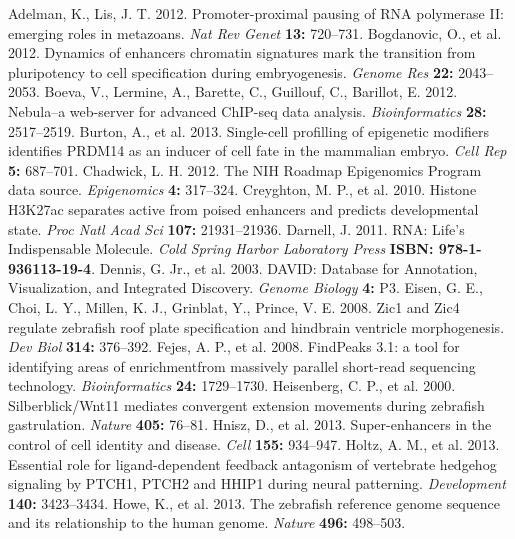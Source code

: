 \begin{thebibliography}{40}
	 Adelman, K., Lis, J. T. 2012. Promoter-proximal pausing of RNA polymerase II: emerging roles in metazoans. \emph{Nat Rev Genet} \textbf{13:} 720--731.
	 Bogdanovic, O., et al. 2012. Dynamics of enhancers chromatin signatures mark the transition from pluripotency to cell specification during embryogenesis. \emph{Genome Res} \textbf{22:} 2043--2053.
	 Boeva, V., Lermine, A., Barette, C., Guillouf, C., Barillot, E. 2012. Nebula--a web-server for advanced ChIP-seq data analysis. \emph{Bioinformatics} \textbf{28:} 2517--2519.
	 Burton, A., et al. 2013. Single-cell profilling of epigenetic modifiers identifies PRDM14 as an inducer of cell fate in the mammalian embryo. \emph{Cell Rep} \textbf{5:} 687--701.
	 Chadwick, L. H. 2012. The NIH Roadmap Epigenomics Program data source. \emph{Epigenomics} \textbf{4:} 317--324.
	 Creyghton, M. P., et al. 2010. Histone H3K27ac separates active from poised enhancers and predicts developmental state. \emph{Proc Natl Acad Sci} \textbf{107:} 21931--21936.
	 Darnell, J. 2011. RNA: Life's Indispensable Molecule. \emph{Cold Spring Harbor Laboratory Press} \textbf{ISBN: 978-1-936113-19-4}.
	 Dennis, G. Jr., et al. 2003. DAVID: Database for Annotation, Visualization, and Integrated Discovery. \emph{Genome Biology} \textbf{4:} P3.
	 Eisen, G. E., Choi, L. Y., Millen, K. J., Grinblat, Y., Prince, V. E. 2008. Zic1 and Zic4 regulate zebrafish roof plate specification and hindbrain ventricle morphogenesis. \emph{Dev Biol} \textbf{314:} 376--392.
	 Fejes, A. P., et al. 2008. FindPeaks 3.1: a tool for identifying areas of enrichmentfrom massively parallel short-read sequencing technology. \emph{Bioinformatics} \textbf{24:} 1729--1730.
	 Heisenberg, C. P., et al. 2000. Silberblick/Wnt11 mediates convergent extension movements during zebrafish gastrulation. \emph{Nature} \textbf{405:} 76--81.
	 Hnisz, D., et al. 2013. Super-enhancers in the control of cell identity and disease. \emph{Cell} \textbf{155:} 934--947.
	 Holtz, A. M., et al. 2013. Essential role for ligand-dependent feedback antagonism of vertebrate hedgehog signaling by PTCH1, PTCH2 and HHIP1 during neural patterning. \emph{Development} \textbf{140:} 3423--3434.
	 Howe, K., et al. 2013. The zebrafish reference genome sequence and its relationship to the human genome. \emph{Nature} \textbf{496:} 498--503.

\end{thebibliography}
